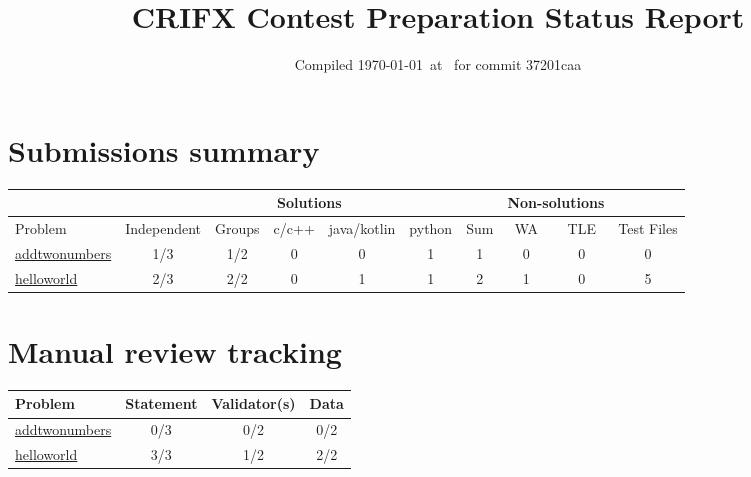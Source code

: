 \documentclass{article}%
\title{CRIFX Contest Preparation Status Report}%
\date{Compiled \today~at \DTMcurrenttime\DTMcurrentzone~for commit 37201caa}%
\begin{document}
%
\normalsize%
\maketitle%
\section*{Submissions summary}%
\label{sec:Submissionssummary}%
\begin{tabular}{|l|c|c|c|c|c|c|c|c|c|}%
\hline%
\rowcolor{cyan}%
&\multicolumn{6}{c}{{\tiny Solutions}}&\multicolumn{2}{|c|}{{\tiny Non-solutions}}&\\%
\hline%
\rowcolor{cyan}%
{\tiny Problem}&{\tiny Independent}&{\tiny Groups}&{\tiny c/c++}&{\tiny java/kotlin}&{\tiny python}&{\tiny Sum}&{\tiny WA}&{\tiny TLE}&{\tiny Test Files}\\%
\hline%
\hyperref[sec:addtwonumbers]{addtwonumbers}&\cellcolor{insufficientred}1/3&\cellcolor{insufficientred}1/2&0&0&1&1&0&0&0\\%
\hline%
\hyperref[sec:helloworld]{helloworld}&\cellcolor{insufficientred}2/3&\cellcolor{sufficientgreen}2/2&0&1&1&2&1&0&5\\%
\hline%
\end{tabular}

%
\section*{Manual review tracking}%
\label{sec:Manualreviewtracking}%
\begin{tabular}{|l|c|c|c|}%
\hline%
\rowcolor{cyan}%
{\tiny Problem}&{\tiny Statement}&{\tiny Validator(s)}&{\tiny Data}\\%
\hline%
\hyperref[sec:addtwonumbers]{addtwonumbers}&\cellcolor{insufficientred}0/3&\cellcolor{insufficientred}0/2&\cellcolor{insufficientred}0/2\\%
\hline%
\hyperref[sec:helloworld]{helloworld}&\cellcolor{sufficientgreen}3/3&\cellcolor{insufficientred}1/2&\cellcolor{sufficientgreen}2/2\\%
\hline%
\end{tabular}

%
\end{document}
